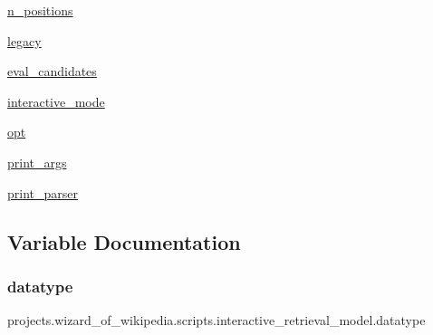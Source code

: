 \begin{DoxyCompactItemize}
\item 
\hyperlink{namespaceprojects_1_1wizard__of__wikipedia_1_1scripts_1_1interactive__retrieval__model_a4e2e054d2a6d1a7d8407e98405c01a00}{n\+\_\+positions}
\item 
\hyperlink{namespaceprojects_1_1wizard__of__wikipedia_1_1scripts_1_1interactive__retrieval__model_a71693aa67217d74a929f944262a85972}{legacy}
\item 
\hyperlink{namespaceprojects_1_1wizard__of__wikipedia_1_1scripts_1_1interactive__retrieval__model_a47b787c2fc7464eb08cdbf93cdeffd3a}{eval\+\_\+candidates}
\item 
\hyperlink{namespaceprojects_1_1wizard__of__wikipedia_1_1scripts_1_1interactive__retrieval__model_a3a52e14647da8957fdb8a0a14c764540}{interactive\+\_\+mode}
\item 
\hyperlink{namespaceprojects_1_1wizard__of__wikipedia_1_1scripts_1_1interactive__retrieval__model_afdd7e3cf2ffbd01ae839087beec532e6}{opt}
\item 
\hyperlink{namespaceprojects_1_1wizard__of__wikipedia_1_1scripts_1_1interactive__retrieval__model_a5495729edb61688640b558a38b7fafaf}{print\+\_\+args}
\item 
\hyperlink{namespaceprojects_1_1wizard__of__wikipedia_1_1scripts_1_1interactive__retrieval__model_a83414476fb9a6c53b0af1ce8b5c9292a}{print\+\_\+parser}
\end{DoxyCompactItemize}


\subsection{Variable Documentation}
\mbox{\label{namespaceprojects_1_1wizard__of__wikipedia_1_1scripts_1_1interactive__retrieval__model_ae707f336fd450f48afc6bda565ad8623}} 
\subsubsection{\texorpdfstring{datatype}{datatype}}
{\footnotesize\ttfamily projects.\+wizard\+\_\+of\+\_\+wikipedia.\+scripts.\+interactive\+\_\+retrieval\+\_\+model.\+datatype}



